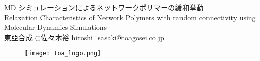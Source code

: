 \begin{minipage}[]{0.84\columnwidth}
	\centering
		\LARGE MD シミュレーションによるネットワークポリマーの緩和挙動  \\
		\large Relaxation Characteristics of Network Polymers with random connectivity using Molecular Dynamics Simulations\\[10mm]
		東亞合成 $\bigcirc$佐々木裕 hiroshi\_sasaki@toagosei.co.jp\\
	\end{minipage}
	\begin{minipage}[]{0.15\columnwidth}
		\begin{figure}\centering
			\texttt{[image: toa\_logo.png]}
		\end{figure}
	\end{minipage}